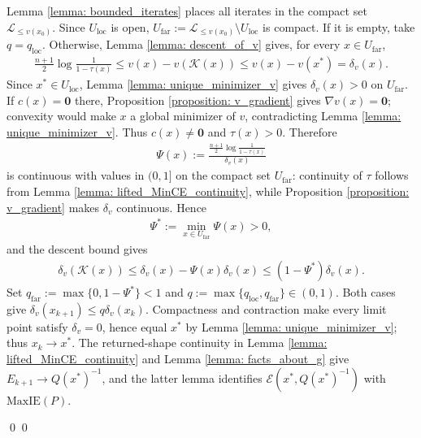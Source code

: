 \documentclass[smallextended]{svjour3}
\let\springerproof\proof
\let\endspringerproof\endproof
\renewenvironment{proof}{\springerproof}{%
  \ifhmode\qed\else\leavevmode\qed\fi\endspringerproof}
\newcommand{\K}{\mathcal{K}}
\newcommand{\E}{\mathcal{E}}
\newcommand{\MaxIE}{\mathrm{MaxIE}}
\begin{document}
\begin{proof}
    Lemma \ref{lemma: bounded_iterates} places all iterates in the compact set
    $\mathcal{L}_{\leq v(x_0)}$. Since $U_{\mathrm{loc}}$ is open,
    $U_{\mathrm{far}}:=\mathcal{L}_{\leq v(x_0)}\setminus U_{\mathrm{loc}}$ is
    compact. If it is empty, take $q=q_{\mathrm{loc}}$. Otherwise, Lemma
    \ref{lemma: descent_of_v} gives, for every $x\in U_{\mathrm{far}}$,
    \begin{align*}
        \frac{n+1}{2}\log \frac{1}{1-\tau(x)}
        \leq v(x) - v(\K(x))
        \leq v(x)- v(x^*) = \delta_v(x).
    \end{align*}
    Since $x^*\in U_{\mathrm{loc}}$, Lemma
    \ref{lemma: unique_minimizer_v} gives $\delta_v(x)>0$ on
    $U_{\mathrm{far}}$. If $c(x)=\mathbf0$ there, Proposition
    \ref{proposition: v_gradient} gives $\nabla v(x)=\mathbf0$; convexity would
    make $x$ a global minimizer of $v$, contradicting Lemma
    \ref{lemma: unique_minimizer_v}. Thus $c(x)\ne\mathbf0$ and $\tau(x)>0$.
    Therefore
    \begin{align*}
        \Psi(x) := \frac{\frac{n+1}{2}\log \frac{1}{1-\tau(x)}}{\delta_v(x)}
    \end{align*}
    is continuous with values in $(0,1]$ on the compact set
    $U_{\mathrm{far}}$: continuity of $\tau$ follows from Lemma
    \ref{lemma: lifted_MinCE_continuity}, while Proposition
    \ref{proposition: v_gradient} makes $\delta_v$ continuous. Hence
    \begin{align*}
        \Psi^* := \min_{x\in U_{\mathrm{far}}} \Psi(x) > 0,
    \end{align*}
    and the descent bound gives
    \begin{align*}
        \delta_v(\K(x))
        \leq
        \delta_v(x)-\Psi(x)\delta_v(x)
        \leq (1-\Psi^*)\delta_v(x).
    \end{align*}
    Set $q_{\mathrm{far}}:=\max\{0,1-\Psi^*\}<1$ and
    $q:=\max\{q_{\mathrm{loc}},q_{\mathrm{far}}\}\in(0,1)$. Both cases give
    $\delta_v(x_{k+1})\leq q\delta_v(x_k)$. Compactness and contraction make every limit point satisfy $\delta_v=0$,
    hence equal $x^*$ by Lemma \ref{lemma: unique_minimizer_v}; thus $x_k\to x^*$.
    The returned-shape continuity in Lemma
    \ref{lemma: lifted_MinCE_continuity} and Lemma
    \ref{lemma: facts_about_g} give
    $E_{k+1}\to Q(x^*)^{-1}$, and the latter lemma identifies
    $\E(x^*,Q(x^*)^{-1})$ with $\MaxIE(P)$.


\end{proof}
\end{document}
